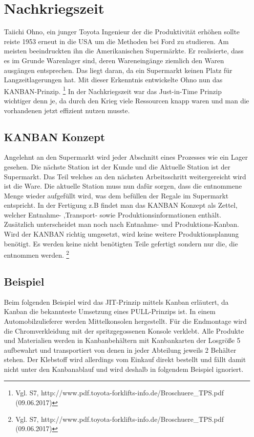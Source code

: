 \documentclass[00_ToyotaProduktionssystem.tex]{subfiles}
\begin{document}
\section{Nachkriegszeit}
Taiichi Ohno, ein junger Toyota Ingenieur der die Produktivität erhöhen sollte reiste 1953 erneut in die USA um die Methoden bei Ford zu studieren. Am meisten beeindruckten ihn die Amerikanischen Supermärkte. Er realisierte, dass es im Grunde Warenlager sind, deren Wareneingänge ziemlich den Waren ausgängen entsprechen. Das liegt daran, da ein Supermarkt keinen Platz für Langzeitlagerungen hat. Mit dieser Erkenntnis entwickelte Ohno nun das KANBAN-Prinzip.
\footnote{Vgl. S7,  http://www.pdf.toyota-forklifts-info.de/Broschuere\_TPS.pdf (09.06.2017)}
 In der Nachkriegszeit war das Just-in-Time Prinzip wichtiger denn je, da durch den Krieg viele Ressourcen knapp waren und man die vorhandenen jetzt effizient nutzen musste.
\subsection{KANBAN Konzept}
Angelehnt an den Supermarkt wird jeder Abschnitt eines Prozesses wie ein Lager gesehen. Die nächste Station ist der Kunde und die Aktuelle Station ist der Supermarkt. Das Teil welches an den nächsten Arbeitsschritt weitergereicht wird ist die Ware. Die aktuelle Station muss nun dafür sorgen, dass die entnommene Menge wieder aufgefüllt wird, was dem befüllen der Regale im Supermarkt entspricht.
In der Fertigung z.B findet man das KANBAN Konzept als Zettel, welcher Entnahme- ,Transport- sowie Produktionsinformationen enthält.
Zusätzlich unterscheidet man noch nach Entnahme- und Produktions-Kanban.
Wird der KANBAN richtig umgesetzt, wird keine weitere Produktionsplanung benötigt. Es werden keine nicht benötigten Teile gefertigt sondern nur die, die entnommen werden. 
\footnote{Vgl. S7,  http://www.pdf.toyota-forklifts-info.de/Broschuere\_TPS.pdf (09.06.2017)}

\subsection{Beispiel}
Beim folgenden Beispiel wird das JIT-Prinzip mittels Kanban erläutert, da Kanban die bekannteste Umsetzung eines PULL-Prinzips ist.
In einem Automobilzulieferer werden Mittelkonsolen hergestellt. Für die Endmontage wird die Chromverkleidung mit der spritzgegossenen Konsole verklebt. Alle Produkte und Materialien werden in Kanbanbehältern mit Kanbankarten der Losgröße 5 aufbewahrt und transportiert von denen in jeder Abteilung jeweils 2 Behälter stehen. Der Klebstoff wird allerdings vom Einkauf direkt bestellt und fällt damit nicht unter den Kanbanablauf und wird deshalb in folgendem Beispiel ignoriert.
\end{document}
